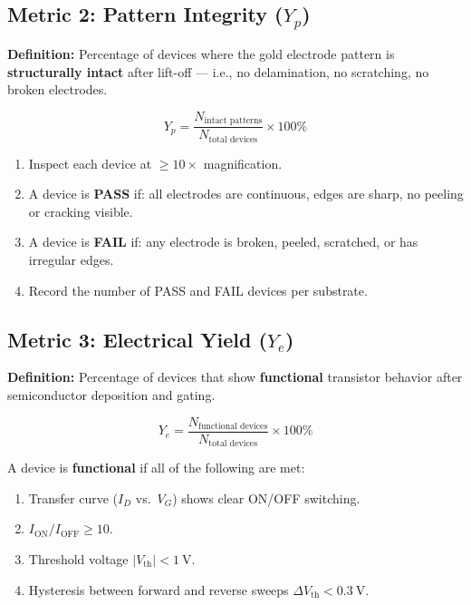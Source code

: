 \documentclass[11pt,a4paper]{article}
\begin{document}
\subsection{Metric 2: Pattern Integrity ($Y_p$)}

\textbf{Definition:} Percentage of devices where the gold electrode
pattern is \textbf{structurally intact} after lift-off --- i.e., no
delamination, no scratching, no broken electrodes.

\begin{equation}
    Y_p = \frac{N_{\text{intact patterns}}}{N_{\text{total devices}}}
    \times 100\%
\end{equation}

\begin{tipbox}
\begin{enumerate}
    \item Inspect each device at $\geq 10\times$ magnification.
    \item A device is \textbf{PASS} if: all electrodes are continuous,
          edges are sharp, no peeling or cracking visible.
    \item A device is \textbf{FAIL} if: any electrode is broken, peeled,
          scratched, or has irregular edges.
    \item Record the number of PASS and FAIL devices per substrate.
\end{enumerate}
\end{tipbox}

\subsection{Metric 3: Electrical Yield ($Y_e$)}

\textbf{Definition:} Percentage of devices that show \textbf{functional}
transistor behavior after semiconductor deposition and gating.

\begin{equation}
    Y_e = \frac{N_{\text{functional devices}}}{N_{\text{total devices}}}
    \times 100\%
\end{equation}

\begin{tipbox}
A device is \textbf{functional} if all of the following are met:
\begin{enumerate}
    \item Transfer curve ($I_D$ vs.\ $V_G$) shows clear ON/OFF switching.
    \item $I_{\text{ON}} / I_{\text{OFF}} \geq 10$.
    \item Threshold voltage $|V_{\text{th}}| < \SI{1}{\V}$.
    \item Hysteresis between forward and reverse sweeps
          $\Delta V_{\text{th}} < \SI{0.3}{\V}$.
\end{enumerate}
\end{tipbox}
\end{document}
